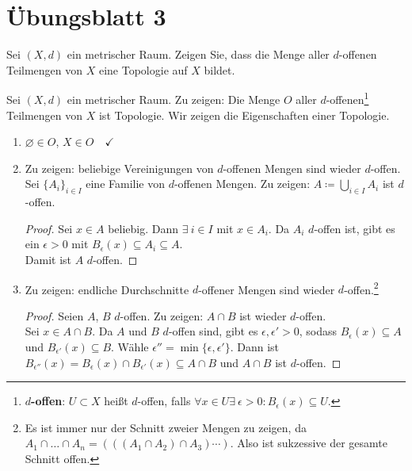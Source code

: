 % 
\newpage
\section{Übungsblatt 3}
\setcounter{problemcounter}{0}

\begin{assignment}
  Sei \( (X,d) \) ein metrischer Raum. Zeigen Sie, dass die Menge aller \( d \)-offenen Teilmengen von \( X \) eine Topologie auf \( X \) bildet.
\end{assignment}
\begin{solution}
  Sei \( (X, d) \) ein metrischer Raum. Zu zeigen: Die Menge \( O \) aller \( d \)-offenen\footnote{\textbf{ \( d \)-offen}: \( U \subset X \) heißt \( d \)-offen, falls \( \forall x \in U \exists \ \epsilon > 0 : B_\epsilon(x) \subseteq U \).} Teilmengen von \( X \) ist Topologie. Wir zeigen die Eigenschaften einer Topologie.
  \begin{enumerate}
    \item \( \varnothing \in O \), \( X \in O \quad \checkmark \) 
    \item Zu zeigen: beliebige Vereinigungen von \( d \)-offenen Mengen sind wieder \( d \)-offen. \\
    Sei \( {\{ A_i \}}_{i \in I} \) eine Familie von \( d \)-offenen Mengen. Zu zeigen: \( A \coloneqq \bigcup_{i \in I}A_i \) ist \( d \)-offen.
    \begin{proof}
      Sei \( x \in A \) beliebig. Dann \( \exists \ i \in I \) mit \( x \in A_i \). Da \( A_i \) \( d \)-offen ist, gibt es ein \( \epsilon > 0 \) mit \( B_\epsilon(x) \subseteq A_i \subseteq A \). \\
      Damit ist \( A \) \( d \)-offen.
    \end{proof}
    
    \item Zu zeigen: endliche Durchschnitte \( d \)-offener Mengen sind wieder \( d \)-offen.\footnote{Es ist immer nur der Schnitt zweier Mengen zu zeigen, da \( A_1 \cap \dots \cap A_n = \left(\left(\left( A_1 \cap A_2 \right) \cap A_3 \right) \cdots \right) \). Also ist sukzessive der gesamte Schnitt offen.}
    \begin{proof}
      Seien \( A \), \( B \) \( d \)-offen. Zu zeigen: \( A \cap B \) ist wieder \( d \)-offen. \\
      Sei \( x \in A \cap B \). Da \( A \) und \( B \) \( d \)-offen sind, gibt es \( \epsilon, \epsilon' > 0 \), sodass \( B_\epsilon(x) \subseteq A \) und \( B_{\epsilon'}(x) \subseteq B \). Wähle \( \epsilon'' = \min \{ \epsilon, \epsilon' \} \). Dann ist \( B_{\epsilon''}(x) = B_\epsilon(x) \cap B_{\epsilon'}(x) \subseteq A \cap B \) und \( A \cap B \) ist \( d \)-offen.
    \end{proof}
  \end{enumerate}
\end{solution}

